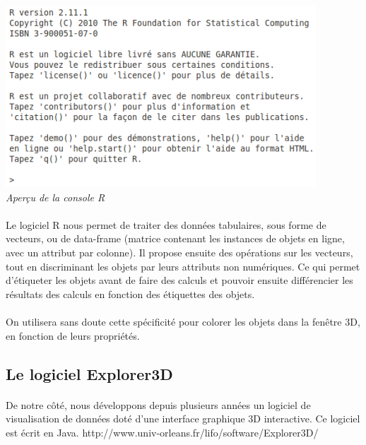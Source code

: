 \begin{center}
\includegraphics[scale=0.7]{demarrage_r.png}\\
\textit{Aperçu de la console R}
\end{center}
\newpage
\paragraph{} 
Le logiciel R nous permet de traiter des données tabulaires, sous forme de vecteurs, ou de data-frame (matrice contenant les instances de objets en ligne, avec un attribut par colonne). Il propose ensuite des opérations sur les vecteurs, tout en discriminant les objets par leurs attributs non numériques. Ce qui permet d’étiqueter les objets avant de faire des calculs et pouvoir ensuite différencier les résultats des calculs en fonction des étiquettes des objets.

\paragraph{} On utilisera sans doute cette spécificité pour colorer les objets dans la fenêtre 3D, en fonction de leurs propriétés.

\newpage

\subsection{Le logiciel Explorer3D}
\paragraph{}
De notre côté, nous développons depuis plusieurs années un logiciel de visualisation de données
doté d'une interface graphique 3D interactive. Ce logiciel est écrit en Java.
http://www.univ-orleans.fr/lifo/software/Explorer3D/

